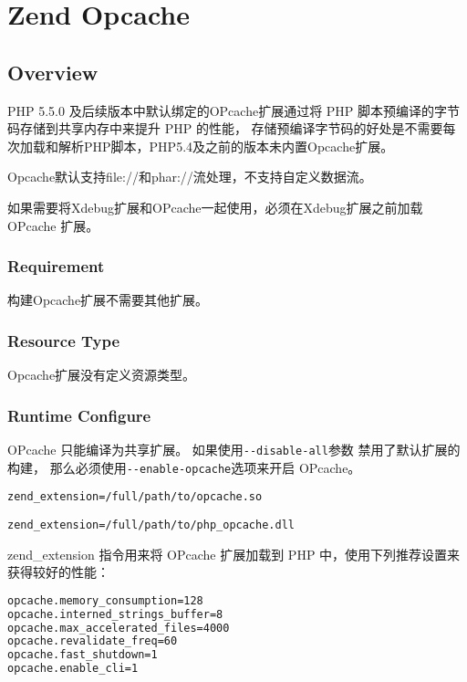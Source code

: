 \part{Zend Opcache}

\chapter{Overview}


PHP 5.5.0 及后续版本中默认绑定的OPcache扩展通过将 PHP 脚本预编译的字节码存储到共享内存中来提升 PHP 的性能， 存储预编译字节码的好处是不需要每次加载和解析PHP脚本，PHP5.4及之前的版本未内置Opcache扩展。

Opcache默认支持file://和phar://流处理，不支持自定义数据流。

如果需要将Xdebug扩展和OPcache一起使用，必须在Xdebug扩展之前加载 OPcache 扩展。

\section{Requirement}

构建Opcache扩展不需要其他扩展。

\section{Resource Type}


Opcache扩展没有定义资源类型。


\section{Runtime Configure}

OPcache 只能编译为共享扩展。 如果使用\texttt{-\/-disable-all}参数 禁用了默认扩展的构建， 那么必须使用\texttt{-\/-enable-opcache}选项来开启 OPcache。


\begin{compactitem}
\item \texttt{zend\_extension=/full/path/to/opcache.so}
\item \texttt{zend\_extension=/full/path/to/php\_opcache.dll}
\end{compactitem}

zend\_extension 指令用来将 OPcache 扩展加载到 PHP 中，使用下列推荐设置来获得较好的性能：

\begin{lstlisting}[language=bash]
opcache.memory_consumption=128
opcache.interned_strings_buffer=8
opcache.max_accelerated_files=4000
opcache.revalidate_freq=60
opcache.fast_shutdown=1
opcache.enable_cli=1
\end{lstlisting}

